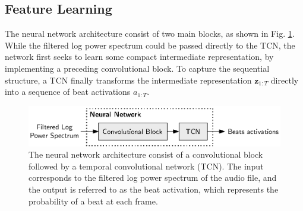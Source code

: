 \documentclass{scrartcl}
\begin{document}
\subsection{Feature Learning}
The neural network architecture consist of two main blocks, as shown in Fig. \ref{fig:neural_net}. While the filtered log power spectrum could be passed directly to the TCN, the network first seeks to learn some compact intermediate representation, by implementing a preceding convolutional block. To capture the sequential structure, a TCN finally transforms the intermediate representation $\mathbf z_{1:T}$ directly into a sequence of beat activations $a_{1:T}$.
\begin{figure}[htbp]
\centering
\includegraphics[scale=1.0]{figures/neural_net.eps}
\caption{The neural network architecture consist of a convolutional block followed by a temporal convolutional network (TCN). The input corresponds to the filtered log power spectrum of the audio file, and the output is referred to as the beat activation, which represents the probability of a beat at each frame.}
\label{fig:neural_net}
\end{figure}    
\end{document}
